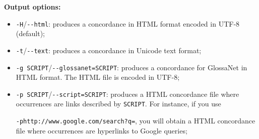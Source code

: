 \bigskip
\noindent \textbf{Output options:}
\begin{itemize}
  \item \verb+-H+/\verb+--html+: produces a concordance in HTML format encoded in
    UTF-8 (default);
  \item \verb+-t+/\verb+--text+: produces a concordance in Unicode text format; 
  \item \verb+-g SCRIPT+/\verb+--glossanet=SCRIPT+: produces a concordance for GlossaNet
  in HTML format. The HTML file is encoded in UTF-8;

  \item \verb+-p SCRIPT+/\verb+--script=SCRIPT+: produces a HTML concordance
  file where occurrences are links described by \verb+SCRIPT+. For instance, if
  you use
  
  \verb$-phttp://www.google.com/search?q=$, you will obtain
  a HTML concordance file where occurrences are hyperlinks to Google queries;


\end{itemize}
